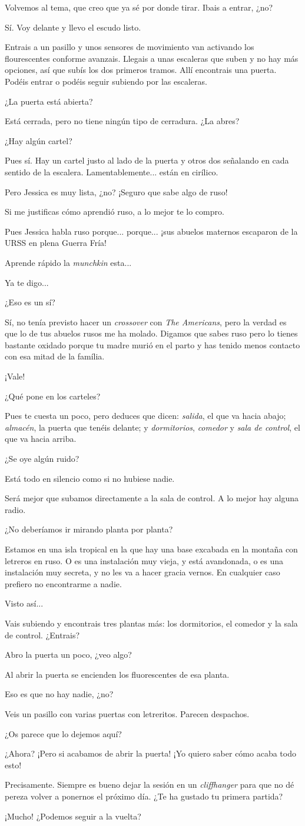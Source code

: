 \documentclass[10pt, a5paper, twocolumn]{article}
\newenvironment{dialogue}
    {\begin{description}[leftmargin=!,align=right,labelwidth=0.cm]}
    {\end{description}}
\newcommand\A{\item[\raisebox{-0.25em}{\scalebox{0.75}{\bctetraedre}}]}
\newcommand\B{\item[\raisebox{-0.25em}{\scalebox{0.75}{\bccube}}]}
\newcommand\E{\item[\raisebox{-0.25em}{\scalebox{0.75}{\bcicosaedre}}]}
\begin{document}
    \begin{dialogue}
        \E Volvemos al tema, que creo que ya sé por donde tirar. Ibais a entrar, ¿no?
        \B Sí. Voy delante y llevo el escudo listo.
        \E Entrais a un pasillo y unos sensores de movimiento van activando los flourescentes conforme avanzais. Llegais a unas escaleras que suben y no hay más opciones, así que subís los dos primeros tramos. Allí encontrais una puerta. Podéis entrar o podéis seguir subiendo por las escaleras.
        \B ¿La puerta está abierta?
        \E Está cerrada, pero no tiene ningún tipo de cerradura. ¿La abres?
        \A ¿Hay algún cartel?
        \E Pues sí. Hay un cartel justo al lado de la puerta y otros dos señalando en cada sentido de la escalera. Lamentablemente... están en cirílico.
        \A Pero Jessica es muy lista, ¿no? ¡Seguro que sabe algo de ruso!
        \E Si me justificas cómo aprendió ruso, a lo mejor te lo compro.
        \A Pues Jessica habla ruso porque... porque... ¡sus abuelos maternos escaparon de la URSS en plena Guerra Fría!
        \E Aprende rápido la \emph{munchkin} esta...
        \B Ya te digo...
        \A ¿Eso es un sí?
        \E Sí, no tenía previsto hacer un \emph{crossover} con \emph{The Americans}, pero la verdad es que lo de tus abuelos rusos me ha molado. Digamos que sabes ruso pero lo tienes bastante oxidado porque tu madre murió en el parto y has tenido menos contacto con esa mitad de la família.
        \A ¡Vale!
        \B ¿Qué pone en los carteles?
        \E Pues te cuesta un poco, pero deduces que dicen: \emph{salida}, el que va hacia abajo; \emph{almacén}, la puerta que tenéis delante; y \emph{dormitorios}, \emph{comedor} y \emph{sala de control}, el que va hacia arriba.
        \B ¿Se oye algún ruido?
        \E Está todo en silencio como si no hubiese nadie.
        \B Será mejor que subamos directamente a la sala de control. A lo mejor hay alguna radio.
        \A ¿No deberíamos ir mirando planta por planta?
        \B Estamos en una isla tropical en la que hay una base excabada en la montaña con letreros en ruso. O es una instalación muy vieja, y está avandonada, o es una instalación muy secreta, y no les va a hacer gracia vernos. En cualquier caso prefiero no encontrarme a nadie.
        \A Visto así...
        \E Vais subiendo y encontrais tres plantas más: los dormitorios, el comedor y la sala de control. ¿Entrais?
        \B Abro la puerta un poco, ¿veo algo?
        \E Al abrir la puerta se encienden los fluorescentes de esa planta.
        \A Eso es que no hay nadie, ¿no?
        \E Veis un pasillo con varias puertas con letreritos. Parecen despachos.
        \B
        \E ¿Os parece que lo dejemos aquí?
        \A ¿Ahora? ¡Pero si acabamos de abrir la puerta! ¡Yo quiero saber cómo acaba todo esto!
        \E Precisamente. Siempre es bueno dejar la sesión en un \emph{cliffhanger} para que no dé pereza volver a ponernos el próximo día. ¿Te ha gustado tu primera partida?
        \A ¡Mucho! ¿Podemos seguir a la vuelta?
    \end{dialogue}
\end{document}
